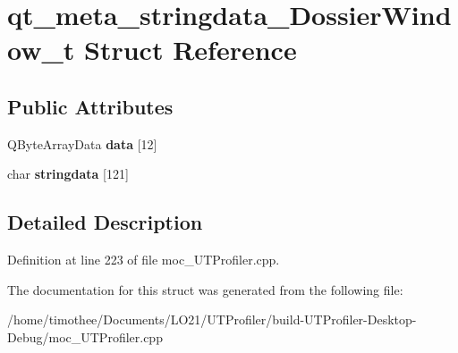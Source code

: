 \hypertarget{structqt__meta__stringdata___dossier_window__t}{\section{qt\-\_\-meta\-\_\-stringdata\-\_\-\-Dossier\-Window\-\_\-t Struct Reference}
\label{structqt__meta__stringdata___dossier_window__t}
}
\subsection*{Public Attributes}
\begin{DoxyCompactItemize}
\item 
\hypertarget{structqt__meta__stringdata___dossier_window__t_a03913a64e3eba6ca43b00dc26d65b925}{Q\-Byte\-Array\-Data {\bfseries data} \mbox{[}12\mbox{]}}\label{structqt__meta__stringdata___dossier_window__t_a03913a64e3eba6ca43b00dc26d65b925}

\item 
\hypertarget{structqt__meta__stringdata___dossier_window__t_af4a224001829112f4e5614deb18c5274}{char {\bfseries stringdata} \mbox{[}121\mbox{]}}\label{structqt__meta__stringdata___dossier_window__t_af4a224001829112f4e5614deb18c5274}

\end{DoxyCompactItemize}


\subsection{Detailed Description}


Definition at line 223 of file moc\-\_\-\-U\-T\-Profiler.\-cpp.



The documentation for this struct was generated from the following file\-:\begin{DoxyCompactItemize}
\item 
/home/timothee/\-Documents/\-L\-O21/\-U\-T\-Profiler/build-\/\-U\-T\-Profiler-\/\-Desktop-\/\-Debug/moc\-\_\-\-U\-T\-Profiler.\-cpp\end{DoxyCompactItemize}
